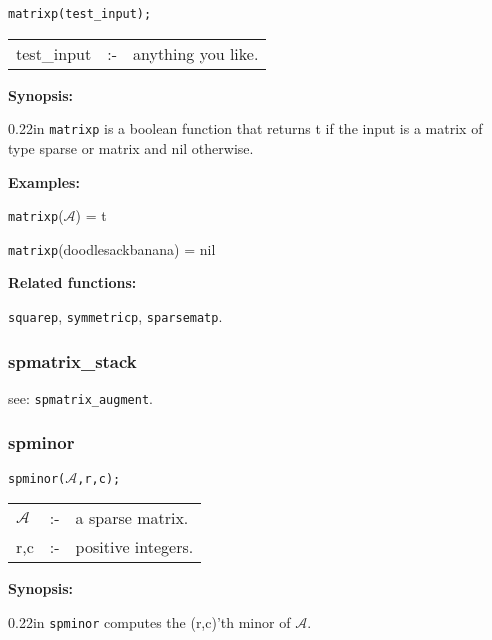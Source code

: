
\hspace*{0.175in} \texttt{matrixp(test\_input);}

\hspace*{0.1in}  
\begin{tabular}{l l l}
test\_input &:-& anything you like.
\end{tabular}

\textbf{Synopsis:} %

\begin{addtolength}{\leftskip}{0.22in}
\texttt{matrixp} is a boolean function that returns t if 
                the input is a matrix of type sparse or matrix and nil otherwise.

\end{addtolength}

\textbf{Examples:}

\hspace*{0.175in} \texttt{matrixp}($\mathcal{A}$) = t 

\hspace*{0.175in} \texttt{matrixp}(doodlesackbanana) = nil

\textbf{Related functions:}

\hspace*{0.175in} \texttt{squarep}, \texttt{symmetricp}, \texttt{sparsematp}.


\subsubsection{spmatrix\_stack}

\hspace*{0.175in} see: \texttt{spmatrix\_augment}.


\subsubsection{spminor}

\hspace*{0.175in} \texttt{spminor($\mathcal{A}$,r,c);}

\hspace*{0.1in}  
\begin{tabular}{l l l} 
$\mathcal{A}$ &:-& a sparse matrix. \\
r,c        &:-& positive integers.
\end{tabular}

\textbf{Synopsis:}

\begin{addtolength}{\leftskip}{0.22in}
                \texttt{spminor} computes the (r,c)'th minor of $\mathcal{A}$.
 
\end{addtolength}
                
